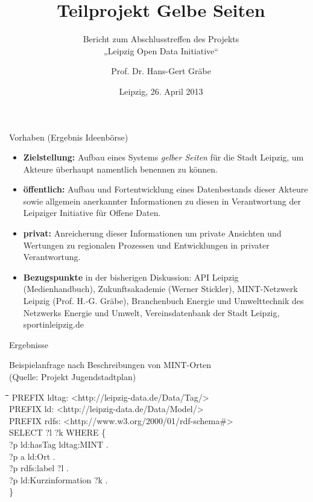 \documentclass{beamer}
\title[Gelbe Seiten]{Teilprojekt Gelbe Seiten}
\subtitle{Bericht zum Abschlusstreffen des Projekts\\ „Leipzig Open Data
  Initiative“}
\author[Gräbe]{Prof. Dr. Hans-Gert Gräbe}
\institute[Uni Leipzig]{Leipzig Open Data Team\\
  \texttt{http://leipzig-data.de}}
\date{Leipzig, 26. April 2013}
\newenvironment{code}{\footnotesize\tt \begin{tabbing}
\hskip12pt\=\hskip12pt\=\hskip12pt\=\hskip12pt\=\hskip5cm\=\hskip5cm\=\kill}
{\end{tabbing}}
\begin{document}
\begin{frame}
\maketitle
\end{frame}
\begin{frame}{Vorhaben (Ergebnis Ideenbörse)}{}
\begin{itemize} 
\item \textbf{Zielstellung:} Aufbau eines Systems \emph{gelber Seiten} für die
  Stadt Leipzig, um Akteure überhaupt namentlich benennen zu können.
\item \textbf{öffentlich:} Aufbau und Fortentwicklung eines Datenbestands
  dieser Akteure sowie allgemein anerkannter Informationen zu diesen in
  Verantwortung der Leipziger Initiative für Offene Daten. 
\item \textbf{privat:} Anreicherung dieser Informationen um private Ansichten
  und Wertungen zu regionalen Prozessen und Entwicklungen in privater
  Verantwortung.
\item \textbf{Bezugspunkte} in der bisherigen Diskussion: API Leipzig
  (Medienhandbuch), Zukunftsakademie (Werner Stickler), MINT-Netzwerk Leipzig
  (Prof. H.-G. Gräbe), Branchenbuch Energie und Umwelttechnik des Netzwerks
  Energie und Umwelt, Vereinsdatenbank der Stadt Leipzig, sportinleipzig.de 
\end{itemize}
\end{frame}

\begin{frame}{Ergebnisse}{}

Beispielanfrage nach Beschreibungen von MINT-Orten\\ (Quelle: Projekt
Jugendstadtplan) 

\begin{code}
  PREFIX ldtag: <http://leipzig-data.de/Data/Tag/>\\
  PREFIX ld: <http://leipzig-data.de/Data/Model/>\\
  PREFIX rdfs: <http://www.w3.org/2000/01/rdf-schema\#>\\
  SELECT ?l ?k WHERE \{\+\\
    ?p ld:hasTag ldtag:MINT .\\
    ?p a ld:Ort .\\
    ?p rdfs:label ?l .\\
    ?p ld:Kurzinformation ?k .\-\\
  \}
\end{code}
\end{frame}
\end{document}
